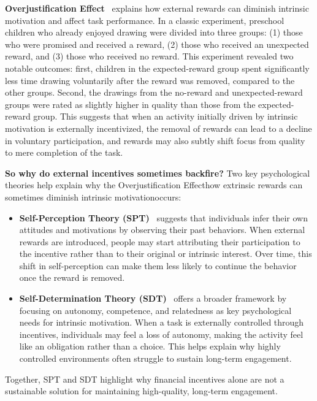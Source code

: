 \noindent\textbf{Overjustification Effect}~\cite{lepper1973undermining} explains how external rewards can diminish intrinsic motivation and affect task performance. In a classic experiment, preschool children who already enjoyed drawing were divided into three groups: (1) those who were promised and received a reward, (2) those who received an unexpected reward, and (3) those who received no reward. This experiment revealed two notable outcomes: first, children in the expected-reward group spent significantly less time drawing voluntarily after the reward was removed, compared to the other groups. Second, the drawings from the no-reward and unexpected-reward groups were rated as slightly higher in quality than those from the expected-reward group. This suggests that when an activity initially driven by intrinsic motivation is externally incentivized, the removal of rewards can lead to a decline in voluntary participation, and rewards may also subtly shift focus from quality to mere completion of the task.

\textbf{So why do external incentives sometimes backfire?} Two key psychological theories help explain why the Overjustification Effect\textemdash{}how extrinsic rewards can sometimes diminish intrinsic motivation\textemdash{}occurs:
\begin{itemize}[left=0cm]
    \item \textbf{Self-Perception Theory (SPT)}~\cite{bem1972self} suggests that individuals infer their own attitudes and motivations by observing their past behaviors. When external rewards are introduced, people may start attributing their participation to the incentive rather than to their original or intrinsic interest. Over time, this shift in self-perception can make them less likely to continue the behavior once the reward is removed.
    \item \textbf{Self-Determination Theory (SDT)}~\cite{deci1971effects} offers a broader framework by focusing on autonomy, competence, and relatedness as key psychological needs for intrinsic motivation. When a task is externally controlled through incentives, individuals may feel a loss of autonomy, making the activity feel like an obligation rather than a choice. This helps explain why highly controlled environments often struggle to sustain long-term engagement.
\end{itemize}
Together, SPT and SDT highlight why financial incentives alone are not a sustainable solution for maintaining high-quality, long-term engagement.

